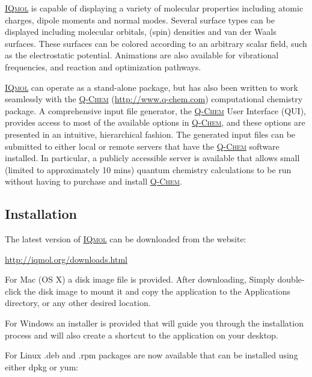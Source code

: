 \documentclass[a4paper,12pt]{article}
\newcommand{\qchem}{\href{http://q-chem.com}{{\scshape Q-Chem}}}
\newcommand{\iqmol}{\href{http://iqmol.org}{{\scshape IQmol}}}
\begin{document}
\iqmol{} is capable of displaying a variety of molecular properties including
atomic charges, dipole moments and normal modes.  Several surface types can be
displayed including molecular orbitals, (spin) densities and van der Waals
surfaces. These surfaces can be colored according to an arbitrary scalar field,
such as the electrostatic potential.  Animations are also available for
vibrational frequencies, and reaction and optimization pathways.

\iqmol{} can operate as a stand-alone package, but has also been written to
work seamlessly with the \qchem{} (\url{http://www.q-chem.com}) computational
chemistry package.  A comprehensive input file generator, the \qchem{} User
Interface (QUI), provides access to most of the available options in \qchem{},
and these options are presented in an intuitive, hierarchical fashion.   The
generated input files can be submitted to either local or remote servers that
have the \qchem{} software installed.  In particular, a publicly accessible
server is available that allows small (limited to approximately 10 mins)
quantum chemistry calculations to be run without having to purchase and install
\qchem{}.



\subsection{Installation}

The latest version of \iqmol{} can be downloaded from the website:
\vspace{-1.0em}
\begin{center}
\url{http://iqmol.org/downloads.html}
\end{center}
\vspace{-1.0em}

For Mac (OS X) a disk image file is provided.  After downloading, Simply
double-click the disk image to mount it and copy the application to the
Applications directory, or any other desired location.

For Windows an installer is provided that will guide you through the
installation process and will also create a shortcut to the application on your
desktop.

For Linux .deb and .rpm packages are now available that can be installed using
either dpkg or yum:

\hspace*{2em}{\tt \#>  sudo dpkg -i iqmol\_2.9.0.deb}\\
\hspace*{2em}{\tt \#> sudo apt-get install -f }
\end{document}
